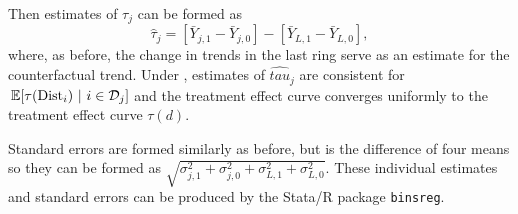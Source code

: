 Then estimates of $\tau_j$ can be formed as
\[
  \hat{\tau}_j = \left[\bar{Y}_{j,1} - \bar{Y}_{j,0}\right] - \left[\bar{Y}_{L,1} - \bar{Y}_{L,0}\right],
\]
where, as before, the change in trends in the last ring serve as an estimate for the counterfactual trend. Under , estimates of $\hat{tau}_j$ are consistent for $\expec{\tau(\dist_i)}{i \in \mathcal{D}_j}$ and the treatment effect curve converges uniformly to the treatment effect curve $\tau(d)$. 

Standard errors are formed similarly as before, but is the difference of four means so they can be formed as $\sqrt{\sigma_{j,1}^2 + \sigma_{j,0}^2 + \sigma_{L,1}^2 + \sigma_{L,0}^2}$. These individual estimates and standard errors can be produced by the Stata/R package \texttt{binsreg}. 

